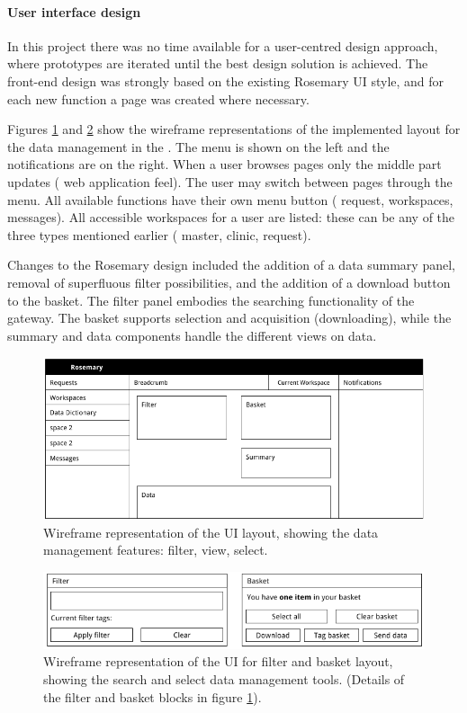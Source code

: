 \paragraph{User interface design}
In this project there was no time available for a user-centred design approach, where prototypes are iterated until the best design solution is achieved.
The front-end design was strongly based on the existing Rosemary UI style, and for each new function a page was created where necessary.

Figures \ref{fig:wireframe-layout} and \ref{fig:wireframe-basket-layout} show the wireframe representations of the implemented layout for the data management in the \ivfprototype{}.
The menu is shown on the left and the notifications are on the right. 
When a user browses pages only the middle part updates (\ie{} web application feel).
The user may switch between pages through the menu. 
All available functions have their own menu button (\eg{} request, workspaces, messages).
All accessible workspaces for a user are listed: these can be any of the three types mentioned earlier (\ie{} master, clinic, request).

Changes to the Rosemary design included the addition of a data summary panel, removal of superfluous filter possibilities, and the addition of a download button to the basket.
The filter panel embodies the searching functionality of the gateway.
The basket supports selection and acquisition (downloading), while the summary and data components handle the different views on data.

\begin{figure}[hb]
	\centering
	\includegraphics[width=0.9\linewidth]{images/evaluation-layout}
	\caption{
		Wireframe representation of the UI layout, showing the data management features: filter, view, select.
	}
	\label{fig:wireframe-layout}
\end{figure}

\begin{figure}[hb]
	\centering
	\includegraphics[width=0.9\linewidth]{images/evaluation-basket-layout}
	\caption{
		Wireframe representation of the UI for filter and basket layout, showing the search and select data management tools.
		(Details of the filter and basket blocks in figure \ref{fig:wireframe-layout}).
	}
	\label{fig:wireframe-basket-layout}
\end{figure}